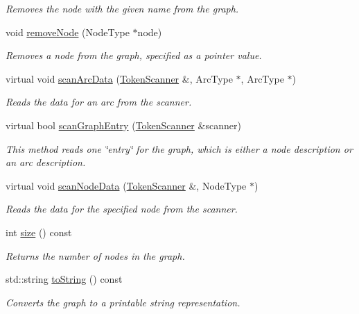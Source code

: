 \begin{DoxyCompactItemize}
\begin{DoxyCompactList}\small\item\em Removes the node with the given name from the graph. \end{DoxyCompactList}\item 
void \mbox{\hyperlink{classGraph_a2dfe63019975561914e0ed79551de108}{remove\+Node}} (Node\+Type $\ast$node)
\begin{DoxyCompactList}\small\item\em Removes a node from the graph, specified as a pointer value. \end{DoxyCompactList}\item 
virtual void \mbox{\hyperlink{classGraph_ac73c985ef66569e5f6df9c315cab466b}{scan\+Arc\+Data}} (\mbox{\hyperlink{classTokenScanner}{Token\+Scanner}} \&, Arc\+Type $\ast$, Arc\+Type $\ast$)
\begin{DoxyCompactList}\small\item\em Reads the data for an arc from the scanner. \end{DoxyCompactList}\item 
virtual bool \mbox{\hyperlink{classGraph_a1c4e1a05a40013ce4e4bb539d05b9937}{scan\+Graph\+Entry}} (\mbox{\hyperlink{classTokenScanner}{Token\+Scanner}} \&scanner)
\begin{DoxyCompactList}\small\item\em This method reads one \char`\"{}entry\char`\"{} for the graph, which is either a node description or an arc description. \end{DoxyCompactList}\item 
virtual void \mbox{\hyperlink{classGraph_a0fc2ca3535b7bff7759aa0c1d35ff08b}{scan\+Node\+Data}} (\mbox{\hyperlink{classTokenScanner}{Token\+Scanner}} \&, Node\+Type $\ast$)
\begin{DoxyCompactList}\small\item\em Reads the data for the specified node from the scanner. \end{DoxyCompactList}\item 
int \mbox{\hyperlink{classGraph_af9593d4a5ff4274efaf429cb4f9e57cc}{size}} () const
\begin{DoxyCompactList}\small\item\em Returns the number of nodes in the graph. \end{DoxyCompactList}\item 
std\+::string \mbox{\hyperlink{classGraph_a1fe5121d6528fdea3f243321b3fa3a49}{to\+String}} () const
\begin{DoxyCompactList}\small\item\em Converts the graph to a printable string representation. \end{DoxyCompactList}\item 

\end{DoxyCompactItemize}
